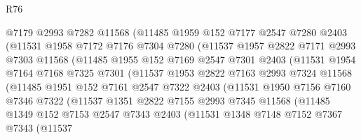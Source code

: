 \begin{lexlean}{R76}
\begin{coremodule}
                @7179
                @2993
                @7282
                @11568
                (@11485
                  @1959
                  @152
                  @7177
                  @2547
                  @7280
                  @2403
                  (@11531
                    @1958
                    @7172
                    @7176
                    @7304
                    @7280
                    (@11537
                      @1957
                      @2822
                      @7171
                      @2993
                      @7303
                      @11568
                      (@11485
                        @1955
                        @152
                        @7169
                        @2547
                        @7301
                        @2403
                        (@11531
                          @1954
                          @7164
                          @7168
                          @7325
                          @7301
                          (@11537
                            @1953
                            @2822
                            @7163
                            @2993
                            @7324
                            @11568
                            (@11485
                              @1951
                              @152
                              @7161
                              @2547
                              @7322
                              @2403
                              (@11531
                                @1950
                                @7156
                                @7160
                                @7346
                                @7322
                                (@11537
                                  @1351
                                  @2822
                                  @7155
                                  @2993
                                  @7345
                                  @11568
                                  (@11485
                                    @1349
                                    @152
                                    @7153
                                    @2547
                                    @7343
                                    @2403
                                    (@11531
                                      @1348
                                      @7148
                                      @7152
                                      @7367
                                      @7343
                                      (@11537

\end{coremodule}
\end{lexlean}
